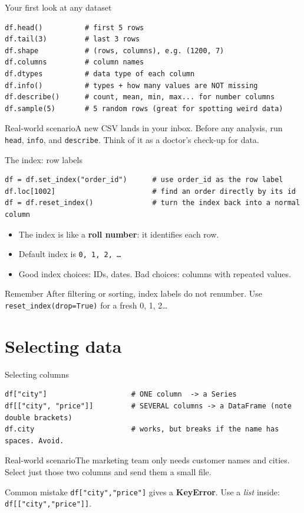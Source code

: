 \documentclass[aspectratio=169,10pt]{beamer}
\newcommand{\code}[1]{\texttt{#1}}
\newcommand{\scenario}[1]{\begin{exampleblock}{Real-world scenario}#1\end{exampleblock}}
\begin{document}
\begin{frame}[fragile]{Your first look at any dataset}
\begin{lstlisting}
df.head()          # first 5 rows
df.tail(3)         # last 3 rows
df.shape           # (rows, columns), e.g. (1200, 7)
df.columns         # column names
df.dtypes          # data type of each column
df.info()          # types + how many values are NOT missing
df.describe()      # count, mean, min, max... for number columns
df.sample(5)       # 5 random rows (great for spotting weird data)
\end{lstlisting}
  \scenario{A new CSV lands in your inbox. Before any analysis, run \code{head}, \code{info},
  and \code{describe}. Think of it as a doctor's check-up for data.}
\end{frame}

\begin{frame}[fragile]{The index: row labels}
\begin{lstlisting}
df = df.set_index("order_id")      # use order_id as the row label
df.loc[1002]                       # find an order directly by its id
df = df.reset_index()              # turn the index back into a normal column
\end{lstlisting}
  \begin{itemize}
    \item The index is like a \textbf{roll number}: it identifies each row.
    \item Default index is \code{0, 1, 2, \dots}
    \item Good index choices: IDs, dates. Bad choices: columns with repeated values.
  \end{itemize}
  \begin{alertblock}{Remember}
    After filtering or sorting, index labels do \alert{not} renumber. Use
    \code{reset\_index(drop=True)} for a fresh 0, 1, 2\dots
  \end{alertblock}
\end{frame}

\section{Selecting data}

\begin{frame}[fragile]{Selecting columns}
\begin{lstlisting}
df["city"]                    # ONE column  -> a Series
df[["city", "price"]]         # SEVERAL columns -> a DataFrame (note double brackets)
df.city                       # works, but breaks if the name has spaces. Avoid.
\end{lstlisting}
  \scenario{The marketing team only needs customer names and cities. Select just those two
  columns and send them a small file.}
  \begin{alertblock}{Common mistake}
    \code{df["city","price"]} gives a \textbf{KeyError}. Use a \emph{list} inside:
    \code{df[["city","price"]]}.
  \end{alertblock}
\end{frame}
\end{document}
